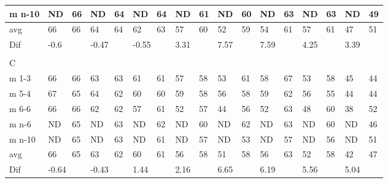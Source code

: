 \begin{table}[H]
\begin{tabular}{l|l|l|l|l|l|l|l|l|l|l|l|l|l|l|ll}
m n-10  &   ND  &     66    &   ND    &   64    &     ND      &     64      &    ND     &     61       &       ND     &       60     &      ND      &       63     &        ND   &       63     & \multicolumn{1}{l|}{ND} & 49 \\ \hline
avg       &      66 &   66     &      64    &  64     &    62         &     63       &      57      &   60    &     52       &    59        &    54        &      61      &      57      &     61       & \multicolumn{1}{l|}{47} &51 \\ \hline
Dif & \multicolumn{2}{l|}{-0.6} & \multicolumn{2}{l|}{-0.47} & \multicolumn{2}{l|}{-0.55} & \multicolumn{2}{l|}{3.31} & \multicolumn{2}{l|}{7.57} & \multicolumn{2}{l|}{7.59}& \multicolumn{2}{l|}{4.25}& \multicolumn{2}{l}{3.39} \\
\multicolumn{17}{l}{ } \\   
C & \multicolumn{2}{l|}{} & \multicolumn{2}{l|}{} & \multicolumn{2}{l|}{} & \multicolumn{2}{l|}{} & \multicolumn{2}{l|}{} & \multicolumn{2}{l|}{}& \multicolumn{2}{l|}{}& \multicolumn{2}{l}{}     \\ \hline
m 1-3   &   66  &      66      &    63  &   63         &   61   &     61       &  57   &      58      &  53   &  61   &  58   &      67      &   53   &      58      & \multicolumn{1}{l|}{45} &44  \\
m 5-4   &    67  &      65      &   64  &     62       &   60    &     60       &  59  &      58      &  56  &  58   &   59  &        62    &   56  &      55      & \multicolumn{1}{l|}{44} &44  \\
m 6-6   &    66   &     66       &  62  &     62       &    57   &      61      &  52   &       57     &   44  & 56   &   52   &      63      &   48 &       60     & \multicolumn{1}{l|}{38} & 52 \\
m n-6   &   ND    &     65       &  ND  &    63        & ND   &      62      &  ND   &      60      & ND & 62   &   ND   &      63      &   ND   &    60        & \multicolumn{1}{l|}{ND} & 46 \\
m n-10  &  ND   &      65      &   ND  &    63        &  ND  &      61      &   ND  &       57    &  ND  &  53 &  ND    &     57       &   ND   &      56      & \multicolumn{1}{l|}{ND} &  51\\ \hline
avg      &   66    &      65      &     63   &     62      &      60&   61      &       56  &     58       &   51   &  58     &  56     &   63         &      52      &    58        & \multicolumn{1}{l|}{42} &47 \\ \hline
Dif & \multicolumn{2}{l|}{-0.64} & \multicolumn{2}{l|}{-0.43} & \multicolumn{2}{l|}{1.44} & \multicolumn{2}{l|}{2.16} & \multicolumn{2}{l|}{6.65} & \multicolumn{2}{l|}{6.19}& \multicolumn{2}{l|}{5.56}& \multicolumn{2}{l}{5.04} \\

\end{tabular}
\end{table}
